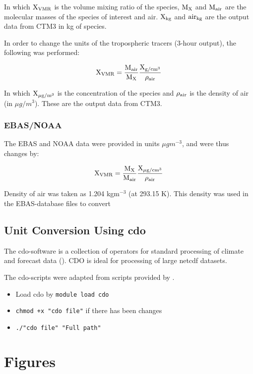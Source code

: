 In which $\mathrm{X_{VMR}}$ is the volume mixing ratio of the species, $\mathrm{M_X}$ and $\mathrm{M_{air}}$ are the molecular masses of the species of interest and air. $\mathrm{X_{kg}}$ and $\mathrm{air_{kg}}$ are the output data from CTM3 in kg of species. 

\medskip

In order to change the units of the tropospheric tracers (3-hour output), the following was performed: 

\begin{equation}
    \mathrm{X_{VMR}} = \frac{\mathrm{M_{air}}}{\mathrm{M_{X}}}\frac{\mathrm{X_{ g/cm^{3}}}}{\mathrm{\rho_{air}}}
    \label{eq:vmr_trop_tracer}
\end{equation}

In which  $\mathrm{X_{\mu g/m^{3}}}$ is the concentration of the species and $\mathrm{\rho_{air}}$ is the density of air (in $\mu g/m^{3}$). These are the output data from CTM3.


\subsection{EBAS/NOAA}\label{sec:unit_conversion_EBASNOAA}

The EBAS and NOAA data were provided in units $\mu g m^{-3}$, and were thus changes by: 

\begin{equation}
    \mathrm{X_{VMR}} = \frac{\mathrm{M_X}}{\mathrm{M_{air}}}\frac{\mathrm{X_{\mu g/cm^{3}}}}{\mathrm{\rho_{air}}}
\end{equation}

Density of air was taken as 1.204 kgm$^{-3}$ (at 293.15 K). This density was used in the EBAS-database files to convert


\section{Unit Conversion Using cdo}\label{sec:cdo}

The \acrshort{cdo}-software is a collection of operators for standard processing of climate and forecast data (\cite{cdo}). CDO is ideal for processing of large \acrshort{netcdf} datasets. 


\medskip

The \acrshort{cdo}-scripts were adapted from scripts provided by \cite{StefaniePersonal}. 



\begin{itemize}
    \item Load cdo by \texttt{module load cdo}
    \item \texttt{chmod +x "cdo file"} if there has been changes
    \item \texttt{./"cdo file" "Full path"} 
\end{itemize}

\cleardoublepage


\chapter{Figures}
\cleardoublepage
